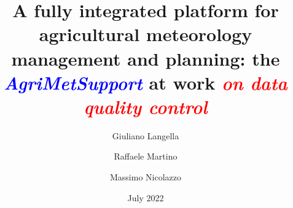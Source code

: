 \documentclass[authoryear,preprint,review,12pt]{elsarticle}
\newcommand{\note}[1]{\emph{\textcolor{red}{#1}}}
\newcommand{\update}[1]{\emph{\textcolor{blue}{#1}}}
\newcommand{\gci}{\update{AgriMetSupport}\xspace}
\begin{document}
\begin{frontmatter}



\title{A fully integrated platform for agricultural meteorology management and planning: the \gci at work \note{on data quality control} }


\author[dia]{Giuliano Langella}
\address[dia]{Department of Agriculture, University of Naples Federico II, Via Università 100, 80055 Portici, NA, Italy}

\author[deeit]{Raffaele Martino}
\author[deeit]{Massimo Nicolazzo}
\address[deeit]{Department of Electrical Engineering and Information Technology, University of Naples Federico II, Via Claudio 21, 80125 Naples, NA, Italy}

\date{July 2022}

\begin{abstract}


\end{abstract}
\end{frontmatter}
\end{document}
